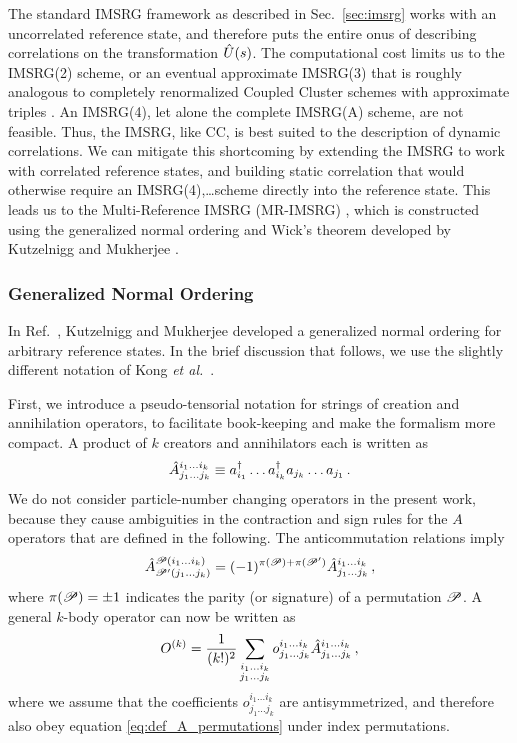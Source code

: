 The standard IMSRG framework as described in Sec.~\ref{sec:imsrg} works
with an uncorrelated reference state, and therefore puts the entire onus
of describing correlations on the transformation $\hat{U}(s)$. The
computational cost limits us to the IMSRG(2) scheme, or an eventual
approximate IMSRG(3) that is roughly analogous to completely renormalized  
Coupled Cluster schemes with approximate triples \cite{Binder:2013fk}. An 
IMSRG(4), let alone the complete IMSRG(A) scheme, are not feasible. Thus, 
the IMSRG, like CC, is best suited to the description of dynamic correlations.
We can mitigate this shortcoming by extending the IMSRG to work with correlated
reference states, and building static correlation that would otherwise require
an IMSRG(4),\ldots scheme directly into the reference state. This leads us to
the Multi-Reference IMSRG (MR-IMSRG) \cite{Hergert:2013ij,Hergert:2014vn,Hergert:2017kx}, 
which is constructed using the generalized normal ordering and Wick's
theorem developed by Kutzelnigg and Mukherjee \cite{Kutzelnigg:1997fk,Mukherjee:1997yg}.

%
%
\subsubsection{Generalized Normal Ordering}
In Ref.~\cite{Kutzelnigg:1997fk}, Kutzelnigg and Mukherjee developed a 
generalized normal ordering for arbitrary reference states. In the brief
discussion that follows, we use the slightly different notation of 
Kong \emph{et al.}~\cite{Kong:2010kx}.

First, we introduce a pseudo-tensorial notation for strings of creation 
and annihilation operators, to facilitate book-keeping and make the formalism
more compact. A product of $k$ creators and annihilators each is written as
\begin{equation}
  \hat{A}^{i_1\ldots i_k}_{j_1\ldots j_k}\equiv
  a^\dag_{i_1}\ldots a^\dag_{i_k}a_{j_k}\ldots a_{j_1}\,.
\end{equation}
We do not consider particle-number changing operators in the present work,
because they cause ambiguities in the contraction and sign rules for the
$A$ operators that are defined in the following. The anticommutation relations 
imply
\begin{equation}\label{eq:def_A_permutations}
  \AO^{\PC(i_1 \ldots i_k)}_{\PC'(j_1 \ldots j_k)} 
  = (-1)^{\pi(\PC)+\pi(\PC')} \AO^{i_1\ldots i_k}_{j_1\ldots j_k}\,,
\end{equation}
where $\pi(\mathcal{P})=\pm1$ indicates the parity (or signature) of a permutation 
$\mathcal{P}$. A general $k$-body operator can now be written as
\begin{equation}
 O^{(k)} = \frac{1}{(k!)^2}\sum_{\substack{i_1\ldots i_k\\j_1\ldots j_k}}
  o^{i_1\ldots i_k}_{j_1\ldots j_k}\hat{A}^{i_1\ldots i_k}_{j_1\ldots j_k}\,,
\end{equation}
where we assume that the coefficients $o^{i_1\ldots i_k}_{j_1\ldots j_k}$
are antisymmetrized, and therefore also obey equation \eqref{eq:def_A_permutations}
under index permutations. 

